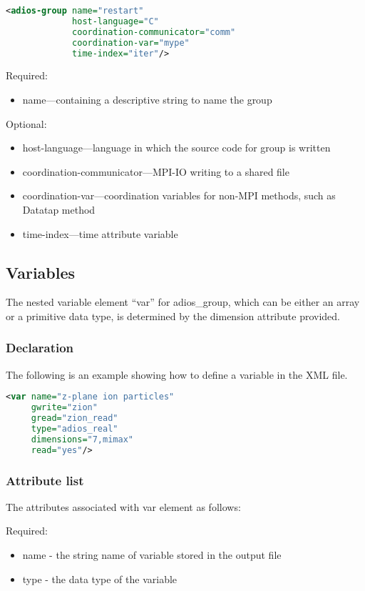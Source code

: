 \begin{lstlisting}[language=XML]
<adios-group name="restart"
             host-language="C"
             coordination-communicator="comm"
             coordination-var="mype"
             time-index="iter"/>
\end{lstlisting}

Required:
\begin{itemize}
\item name---containing a descriptive string to name the group
\end{itemize}

Optional:
\begin{itemize}
\item host-language---language in which the source code for group is written
\item coordination-communicator---MPI-IO writing to a shared file
\item coordination-var---coordination variables for non-MPI methods, such as Datatap method
\item time-index---time attribute variable
\end{itemize}

\subsection{Variables}
\label{section-xml-variables}
The nested variable element ``var'' for adios\_group, which can be either an array 
or a primitive data type, is determined by the dimension attribute provided. 

\subsubsection{Declaration}

The following is an example showing how to define a variable in the XML file. 
\begin{lstlisting}[language=XML]
<var name="z-plane ion particles"
     gwrite="zion" 
     gread="zion_read" 
     type="adios_real" 
     dimensions="7,mimax" 
     read="yes"/>
\end{lstlisting}

\subsubsection{Attribute list}
The attributes associated with var element  as follows: 

Required:
\begin{itemize}
\item name - the string name of variable stored in the output file
\item type - the data type of the variable
\end{itemize}

